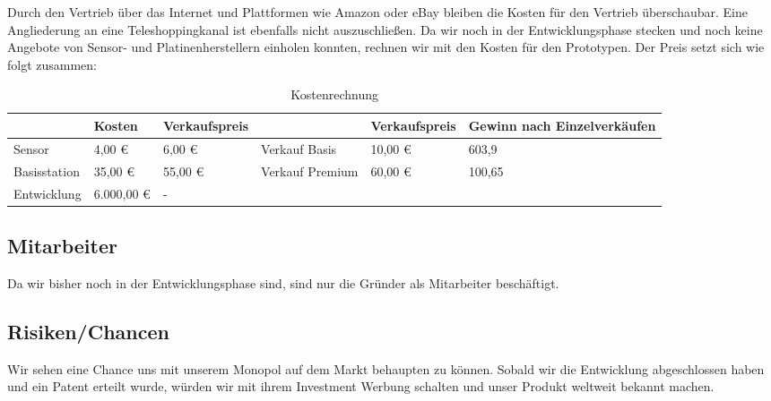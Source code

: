 			Durch den Vertrieb über das Internet und Plattformen wie Amazon oder eBay bleiben die Kosten für den Vertrieb überschaubar. Eine Angliederung an eine Teleshoppingkanal ist ebenfalls nicht auszuschließen. Da wir noch in der Entwicklungsphase stecken und noch keine Angebote von Sensor- und Platinenherstellern einholen konnten, rechnen wir mit den Kosten für den Prototypen. Der Preis setzt sich wie folgt zusammen:
\begin{table}[htbp]
  \centering
  \caption{Kostenrechnung}
    \begin{tabularx}{\textwidth}{|X|XXXXX|}
    \toprule
          & Kosten & Verkaufspreis &       & Verkaufspreis & Gewinn nach Einzelverkäufen \\
    \midrule
    Sensor & 4,00 € & 6,00 € & Verkauf Basis & 10,00 € & 603,9 \\
    Basisstation & 35,00 € & 55,00 € & Verkauf Premium & 60,00 € & 100,65 \\
    Entwicklung & 6.000,00 € & -     &       &       &  \\
    \bottomrule
    \end{tabularx}%
  \label{tab:addlabel}%
\end{table}%

\subsection{Mitarbeiter}
	Da wir bisher noch in der Entwicklungsphase sind, sind nur die Gründer als Mitarbeiter beschäftigt. 
			
\subsection{Risiken/Chancen}
	Wir sehen eine Chance uns mit unserem Monopol auf dem Markt behaupten zu können. 
			Sobald wir die Entwicklung abgeschlossen haben und ein Patent erteilt wurde, würden wir mit ihrem Investment Werbung schalten und unser Produkt weltweit bekannt machen.

